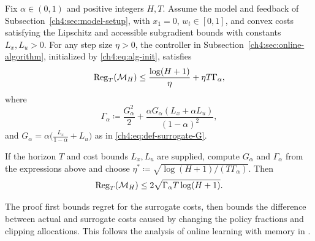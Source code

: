 \begin{Thm:Theorem}
\label{ch4:thm:regret-bound}
Fix $\alpha\in(0,1)$ and positive integers $H,T$.
Assume the model and feedback of Subsection~\ref{ch4:sec:model-setup},
with $x_1=0$, $w_t\in[0,1]$, and convex costs satisfying the Lipschitz
and accessible subgradient bounds with constants $L_x,L_u>0$.
For any step size $\eta>0$, the controller in
Subsection~\ref{ch4:sec:online-algorithm}, initialized by \eqref{ch4:eq:alg-init}, satisfies
\begin{equation}
\label{ch4:eq:regret-theorem-bound}
\mathrm{Reg}_T(\mathcal M_H)
\le
\frac{\log(H+1)}{\eta}+\eta T\Gamma_\alpha,
\end{equation}
where
\begin{equation}
\label{ch4:eq:def-Gamma-alpha}
\Gamma_\alpha
\coloneqq
\frac{G_\alpha^2}{2}
+
\frac{\alpha G_\alpha(L_x+\alpha L_u)}{(1-\alpha)^2},
\end{equation}
and $G_\alpha=\alpha\bigl(\frac{L_x}{1-\alpha}+L_u\bigr)$ as in
\eqref{ch4:eq:def-surrogate-G}.

If the horizon $T$ and cost bounds $L_x,L_u$ are supplied, compute
$G_\alpha$ and $\Gamma_\alpha$ from the expressions above and choose
$\eta^*\coloneqq\sqrt{\log(H+1)/(T\Gamma_\alpha)}$. Then
\begin{equation}
\label{ch4:eq:regret-theorem-optimized}
\mathrm{Reg}_T(\mathcal M_H)\le 2\sqrt{\Gamma_\alpha T\log(H+1)}.
\end{equation}
\end{Thm:Theorem}

The proof first bounds regret for the surrogate costs, then bounds the
difference between actual and surrogate costs caused by changing the policy
fractions and clipping allocations. This follows the analysis of online
learning with memory in
\cite[App.~C, proof of Thm.~3.1]{kumar2023unbounded}.

